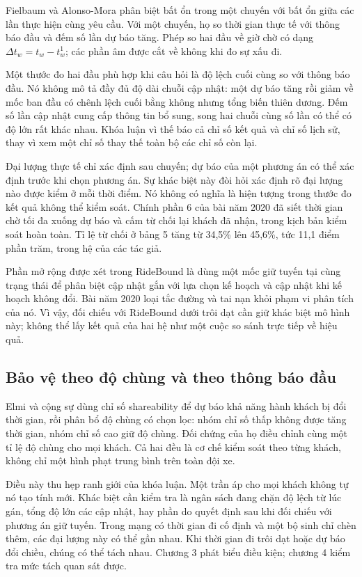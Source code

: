 Fielbaum và Alonso-Mora \cite{fielbaum2020} phân biệt bất ổn trong một chuyến với
bất ổn giữa các lần thực hiện cùng yêu cầu. Với một chuyến, họ so thời gian thực tế với
thông báo đầu và đếm số lần dự báo tăng. Phép so hai đầu về giờ chờ có dạng
$\Delta t_w=t_w-t_w^1$; các phần âm được cắt về không khi đo sự xấu đi.

Một thước đo hai đầu phù hợp khi câu hỏi là độ lệch cuối cùng so với thông báo đầu.
Nó không mô tả đầy đủ độ dài chuỗi cập nhật: một dự báo tăng rồi giảm về mốc ban đầu
có chênh lệch cuối bằng không nhưng tổng biến thiên dương. Đếm số lần cập nhật cung
cấp thông tin bổ sung, song hai chuỗi cùng số lần có thể có độ lớn rất khác nhau.
Khóa luận vì thế báo cả chỉ số kết quả và chỉ số lịch sử, thay vì xem một chỉ số thay
thế toàn bộ các chỉ số còn lại.

Đại lượng thực tế chỉ xác định sau chuyến; dự báo của một phương án có thể xác định
trước khi chọn phương án. Sự khác biệt này đòi hỏi xác định rõ đại lượng nào được
kiểm ở mỗi thời điểm. Nó không có nghĩa là hiện tượng trong thước đo kết quả không
thể kiểm soát. Chính phần 6 của bài năm 2020 đã siết thời gian chờ tối đa xuống dự báo
và cấm từ chối lại khách đã nhận, trong kịch bản kiểm soát hoàn toàn. Tỉ lệ từ chối ở
bảng 5 tăng từ 34,5\% lên 45,6\%, tức 11,1 điểm phần trăm, trong hệ của các tác giả.

Phần mở rộng được xét trong RideBound là dùng một mốc giữ tuyến tại cùng trạng thái
để phân biệt cập nhật gắn với lựa chọn kế hoạch và cập nhật khi kế hoạch không đổi.
Bài năm 2020 loại tắc đường và tai nạn khỏi phạm vi phân tích của nó. Vì vậy, đối
chiếu với RideBound dưới trôi dạt cần giữ khác biệt mô hình này; không thể lấy kết
quả của hai hệ như một cuộc so sánh trực tiếp về hiệu quả.

\subsection{Bảo vệ theo độ chùng và theo thông báo đầu}

Elmi và cộng sự \cite{elmi2026} dùng chỉ số shareability để dự báo khả năng hành khách
bị đổi thời gian, rồi phân bổ độ chùng có chọn lọc: nhóm chỉ số thấp không được tăng
thời gian, nhóm chỉ số cao giữ độ chùng. Đối chứng của họ điều chỉnh cùng một tỉ lệ độ
chùng cho mọi khách. Cả hai đều là cơ chế kiểm soát theo từng khách, không chỉ một
hình phạt trung bình trên toàn đội xe.

Điều này thu hẹp ranh giới của khóa luận. Một trần áp cho mọi khách không tự nó tạo
tính mới. Khác biệt cần kiểm tra là ngân sách đang chặn độ lệch từ lúc gán, tổng độ
lớn các cập nhật, hay phần do quyết định sau khi đối chiếu với phương án giữ tuyến.
Trong mạng có thời gian đi cố định và một bộ sinh chỉ chèn thêm, các đại lượng này
có thể gần nhau. Khi thời gian đi trôi dạt hoặc dự báo đổi chiều, chúng có thể tách
nhau. Chương 3 phát biểu điều kiện; chương 4 kiểm tra mức tách quan sát được.

